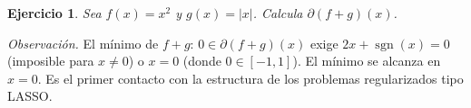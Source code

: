 \documentclass[11pt]{report}
\newtheorem{ex}{Ejercicio}
\begin{document}


\begin{ex}
Sea \( f(x) = x^2 \) y \( g(x) = |x| \). Calcula \( \partial (f + g)(x) \). %
\end{ex}





\emph{Observación.} El mínimo de \( f+g \): \( 0 \in \partial(f+g)(x) \) exige \( 2x + \operatorname{sgn}(x) = 0 \) (imposible para \( x \neq 0 \)) o \( x = 0 \) (donde \( 0 \in [-1,1] \)). El mínimo se alcanza en \( x = 0 \). Es el primer contacto con la estructura de los problemas regularizados tipo LASSO.

\end{document}

